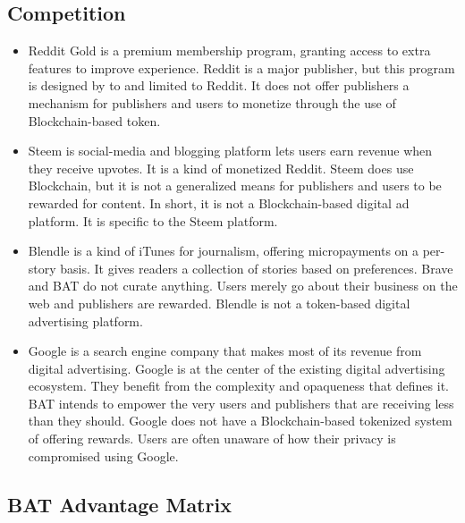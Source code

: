 \documentclass[11pt]{article}
\begin{document}
\subsection{Competition}
\label{sec-5-1}
\begin{itemize}
\item{Reddit Gold is a premium membership program, granting access to extra features to improve experience. Reddit is a major publisher, but this program is designed by to and limited to Reddit. It does not offer publishers a mechanism for publishers and users to monetize through the use of Blockchain-based token.}
\item{Steem is social-media and blogging platform lets users earn revenue when they receive upvotes. It is a kind of monetized Reddit. Steem does use Blockchain, but it is not a generalized means for publishers and users to be rewarded for content. In short, it is not a Blockchain-based digital ad platform. It is specific to the Steem platform. }
\item{Blendle is a kind of iTunes for journalism, offering micropayments on a per-story basis. It gives  readers a collection of stories based on preferences. Brave and BAT do not curate anything. Users merely go about their business on the web and publishers are rewarded. Blendle is not a token-based digital advertising platform. }
\item{Google is a search engine company that makes most of its revenue from digital advertising. Google is at the center of the existing digital advertising ecosystem. They benefit from the complexity and opaqueness that defines it. BAT intends to empower the very users and publishers that are receiving less than they should. Google does not have a Blockchain-based tokenized system of offering rewards. Users are often unaware of how their privacy is compromised using Google.}
\end{itemize}

\subsection{BAT Advantage Matrix}
\label{sec-5-2}
\end{document}
